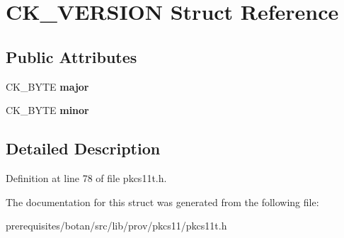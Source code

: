 \hypertarget{struct_c_k___v_e_r_s_i_o_n}{}\section{C\+K\+\_\+\+V\+E\+R\+S\+I\+ON Struct Reference}
\label{struct_c_k___v_e_r_s_i_o_n}
\subsection*{Public Attributes}
\begin{DoxyCompactItemize}
\item 
\mbox{\label{struct_c_k___v_e_r_s_i_o_n_ac66d4dfdec725c04681bdbb6f64f490a}} 
C\+K\+\_\+\+B\+Y\+TE {\bfseries major}
\item 
\mbox{\label{struct_c_k___v_e_r_s_i_o_n_a00a75bcce8f80272abfeb9f8ffc0030c}} 
C\+K\+\_\+\+B\+Y\+TE {\bfseries minor}
\end{DoxyCompactItemize}


\subsection{Detailed Description}


Definition at line 78 of file pkcs11t.\+h.



The documentation for this struct was generated from the following file\+:\begin{DoxyCompactItemize}
\item 
prerequisites/botan/src/lib/prov/pkcs11/pkcs11t.\+h\end{DoxyCompactItemize}
